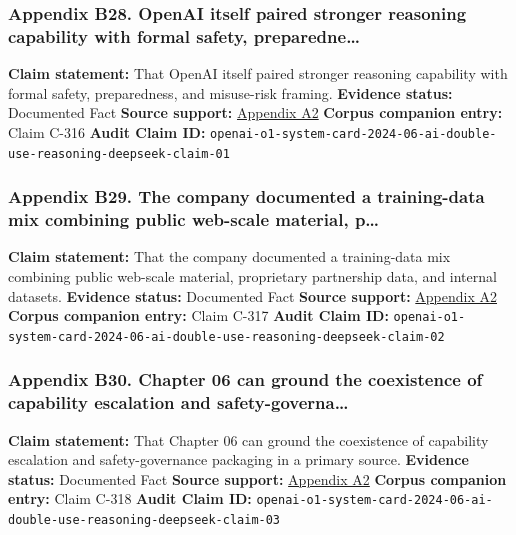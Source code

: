 \documentclass[
  american,
  11pt,
  letterpaper,
]{article}
\begin{document}
\subsubsection{Appendix B28. OpenAI itself paired stronger reasoning
capability with formal safety,
preparedne\ldots{}}\label{appendix-b28-openai-itself-paired-stronger-reasoning-capability-with-formal-safety-preparedne}

\textbf{Claim statement:} That OpenAI itself paired stronger reasoning
capability with formal safety, preparedness, and misuse-risk framing.
\textbf{Evidence status:} Documented Fact \textbf{Source support:}
\hyperref[appendix-a2-openai-o1-system-card]{Appendix A2} \textbf{Corpus
companion entry:} Claim C-316 \textbf{Audit Claim ID:}
\texttt{openai-o1-system-card-2024-06-ai-double-use-reasoning-deepseek-claim-01}

\subsubsection{Appendix B29. The company documented a training-data mix
combining public web-scale material,
p\ldots{}}\label{appendix-b29-the-company-documented-a-training-data-mix-combining-public-web-scale-material-p}

\textbf{Claim statement:} That the company documented a training-data
mix combining public web-scale material, proprietary partnership data,
and internal datasets. \textbf{Evidence status:} Documented Fact
\textbf{Source support:}
\hyperref[appendix-a2-openai-o1-system-card]{Appendix A2} \textbf{Corpus
companion entry:} Claim C-317 \textbf{Audit Claim ID:}
\texttt{openai-o1-system-card-2024-06-ai-double-use-reasoning-deepseek-claim-02}

\subsubsection{Appendix B30. Chapter 06 can ground the coexistence of
capability escalation and
safety-governa\ldots{}}\label{appendix-b30-chapter-06-can-ground-the-coexistence-of-capability-escalation-and-safety-governa}

\textbf{Claim statement:} That Chapter 06 can ground the coexistence of
capability escalation and safety-governance packaging in a primary
source. \textbf{Evidence status:} Documented Fact \textbf{Source
support:} \hyperref[appendix-a2-openai-o1-system-card]{Appendix A2}
\textbf{Corpus companion entry:} Claim C-318 \textbf{Audit Claim ID:}
\texttt{openai-o1-system-card-2024-06-ai-double-use-reasoning-deepseek-claim-03}
\end{document}
